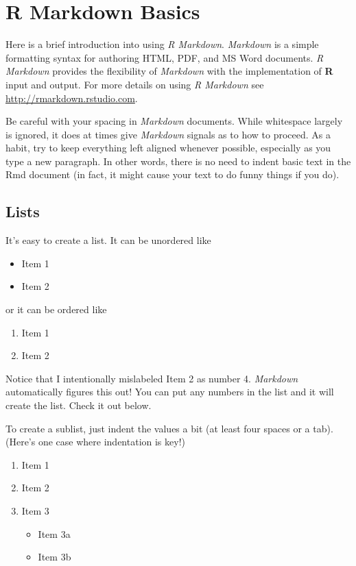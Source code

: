 \documentclass[twoside,12pt,final]{ucthesis-CA2012}
\providecommand{\tightlist}{%
  \setlength{\itemsep}{0pt}\setlength{\parskip}{0pt}}
\begin{document}
\begin{ucmainmatter}
\hypertarget{rmd-basics}{%
\chapter{R Markdown Basics}\label{rmd-basics}}


Here is a brief introduction into using \emph{R Markdown}. \emph{Markdown} is a simple formatting syntax for authoring HTML, PDF, and MS Word documents. \emph{R Markdown} provides the flexibility of \emph{Markdown} with the implementation of \textbf{R} input and output. For more details on using \emph{R Markdown} see \url{http://rmarkdown.rstudio.com}.

Be careful with your spacing in \emph{Markdown} documents. While whitespace largely is ignored, it does at times give \emph{Markdown} signals as to how to proceed. As a habit, try to keep everything left aligned whenever possible, especially as you type a new paragraph. In other words, there is no need to indent basic text in the Rmd document (in fact, it might cause your text to do funny things if you do).

\hypertarget{lists}{%
\section{Lists}\label{lists}}

It's easy to create a list. It can be unordered like
\begin{itemize}
\tightlist
\item
  Item 1
\item
  Item 2
\end{itemize}
or it can be ordered like
\begin{enumerate}
\def\labelenumi{\arabic{enumi}.}
\tightlist
\item
  Item 1
\item
  Item 2
\end{enumerate}
Notice that I intentionally mislabeled Item 2 as number 4. \emph{Markdown} automatically figures this out! You can put any numbers in the list and it will create the list. Check it out below.

To create a sublist, just indent the values a bit (at least four spaces or a tab). (Here's one case where indentation is key!)
\begin{enumerate}
\def\labelenumi{\arabic{enumi}.}
\tightlist
\item
  Item 1
\item
  Item 2
\item
  Item 3
  \begin{itemize}
  \tightlist
  \item
    Item 3a
  \item
    Item 3b
  \end{itemize}
\end{enumerate}
\hypertarget{line-breaks}{%
}
\end{ucmainmatter}
\end{document}
